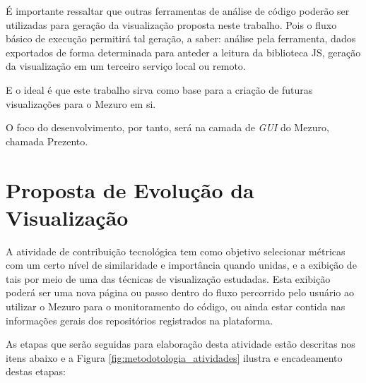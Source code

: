 É importante ressaltar que outras ferramentas de análise de código poderão ser
utilizadas para geração da visualização proposta neste trabalho. Pois o fluxo
básico de execução permitirá tal geração, a saber: análise pela ferramenta,
dados exportados de forma determinada para anteder a leitura da biblioteca JS,
geração da visualização em um terceiro serviço local ou remoto.

E o ideal é que este trabalho sirva como base para a criação de futuras
visualizações para o Mezuro em si.

O foco do desenvolvimento, por tanto, será na camada de \textit{GUI} do Mezuro,
chamada Prezento.

\section{Proposta de Evolução da Visualização}

A atividade de contribuição tecnológica tem como objetivo selecionar métricas
com um certo nível  de similaridade e importância quando unidas, e a exibição de
tais por meio de uma das técnicas de visualização estudadas. Esta exibição
poderá ser uma nova página ou passo dentro do fluxo percorrido pelo usuário ao
utilizar o Mezuro para o monitoramento do código, ou ainda estar contida nas
informações gerais dos repositórios registrados na plataforma.

As etapas que serão seguidas para elaboração desta atividade estão descritas
nos itens abaixo e a Figura \ref{fig:metodotologia_atividades} ilustra e
encadeamento destas etapas:

